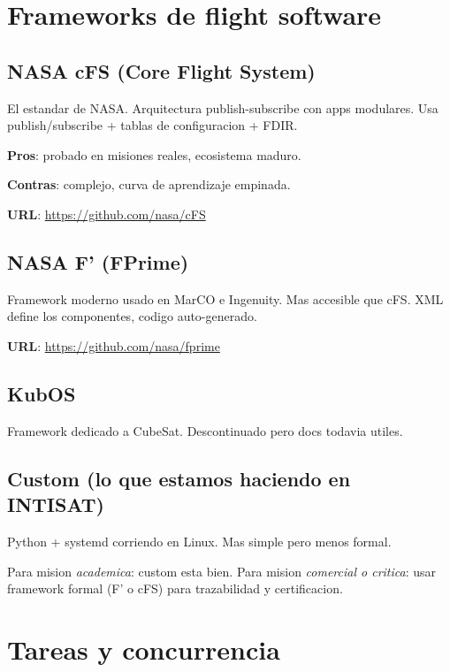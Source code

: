 \documentclass[11pt,a4paper,oneside,openright]{book}
\begin{document}
\chapter{Frameworks de flight software}

\section{NASA cFS (Core Flight System)}

El estandar de NASA. Arquitectura publish-subscribe con apps
modulares. Usa publish/subscribe + tablas de configuracion + FDIR.

\textbf{Pros}: probado en misiones reales, ecosistema maduro.

\textbf{Contras}: complejo, curva de aprendizaje empinada.

\textbf{URL}: \url{https://github.com/nasa/cFS}

\section{NASA F' (FPrime)}

Framework moderno usado en MarCO e Ingenuity. Mas accesible que cFS.
XML define los componentes, codigo auto-generado.

\textbf{URL}: \url{https://github.com/nasa/fprime}

\section{KubOS}

Framework dedicado a CubeSat. Descontinuado pero docs todavia utiles.

\section{Custom (lo que estamos haciendo en INTISAT)}

Python + systemd corriendo en Linux. Mas simple pero menos formal.

\begin{cuidado}
Para mision \emph{academica}: custom esta bien. Para mision
\emph{comercial o critica}: usar framework formal (F' o cFS) para
trazabilidad y certificacion.
\end{cuidado}

\chapter{Tareas y concurrencia}
\end{document}
